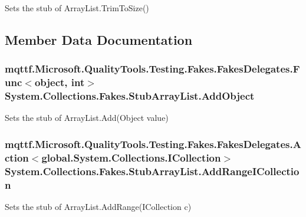 Sets the stub of Array\-List.\-Trim\-To\-Size()



\subsection{Member Data Documentation}
\hypertarget{class_system_1_1_collections_1_1_fakes_1_1_stub_array_list_a4c4c6a2f422e36af3e1e6292637687eb}{
\subsubsection[{Add\-Object}]{\setlength{\rightskip}{0pt plus 5cm}mqttf.\-Microsoft.\-Quality\-Tools.\-Testing.\-Fakes.\-Fakes\-Delegates.\-Func$<$object, int$>$ System.\-Collections.\-Fakes.\-Stub\-Array\-List.\-Add\-Object}}\label{class_system_1_1_collections_1_1_fakes_1_1_stub_array_list_a4c4c6a2f422e36af3e1e6292637687eb}


Sets the stub of Array\-List.\-Add(\-Object value)

\hypertarget{class_system_1_1_collections_1_1_fakes_1_1_stub_array_list_a00d2ee23c5c42eedde6f900e77ca0769}{
\subsubsection[{Add\-Range\-I\-Collection}]{\setlength{\rightskip}{0pt plus 5cm}mqttf.\-Microsoft.\-Quality\-Tools.\-Testing.\-Fakes.\-Fakes\-Delegates.\-Action$<$global.\-System.\-Collections.\-I\-Collection$>$ System.\-Collections.\-Fakes.\-Stub\-Array\-List.\-Add\-Range\-I\-Collection}}\label{class_system_1_1_collections_1_1_fakes_1_1_stub_array_list_a00d2ee23c5c42eedde6f900e77ca0769}


Sets the stub of Array\-List.\-Add\-Range(\-I\-Collection c)

